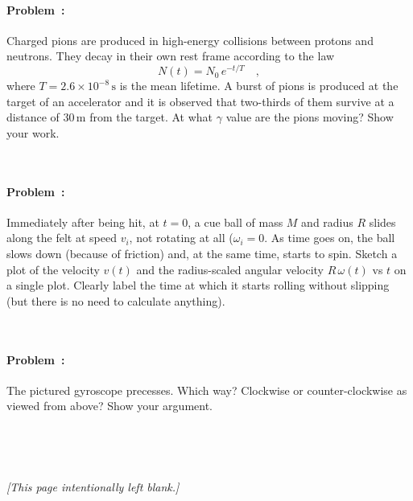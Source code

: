 \documentclass[12pt]{article}
\newcommand{\m}{\mathrm{m}}
\newcommand{\s}{\mathrm{s}}
\newcounter{problem}
\begin{document}
\paragraph{Problem~\theproblem:}%
Charged pions are produced in high-energy collisions between protons
and neutrons. They decay in their own rest frame according to the law
\begin{equation}
N(t) = N_0\,e^{-t/T} \quad ,
\end{equation}
where $T=2.6\times10^{-8}\,\s$ is the mean lifetime. A burst of pions
is produced at the target of an accelerator and it is observed that
two-thirds of them survive at a distance of $30\,\m$ from the
target. At what $\gamma$ value are the pions moving?  Show your work.

~ \vfill ~

\clearpage

\paragraph{Problem~\theproblem:}%
Immediately after being hit, at $t=0$, a cue ball of mass $M$ and
radius $R$ slides along the felt at speed $v_i$, not rotating at all
($\omega_i = 0$.  As time goes on, the ball slows down (because of
friction) and, at the same time, starts to spin.  Sketch a plot of the
velocity $v(t)$ and the radius-scaled angular velocity $R\,\omega(t)$
vs $t$ on a single plot.  Clearly label the time at which it starts
rolling without slipping (but there is no need to calculate anything).

~ \vfill ~

\paragraph{Problem~\theproblem:}%
The pictured gyroscope precesses.  Which way?  Clockwise or
counter-clockwise as viewed from above?  Show your argument.

~ \vfill ~

\clearpage

~ \vfill ~

\begin{center}
\textsl{[This page intentionally left blank.]}
\end{center}

~ \vfill ~
\end{document}
